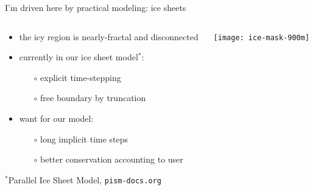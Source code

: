\documentclass{beamer}
\begin{document}
\begin{frame}{I'm driven here by practical modeling: ice sheets}

\begin{columns}
\begin{column}{0.5\textwidth}
\begin{itemize}
\small
\item the icy region is nearly-fractal and disconnected
\item currently in our ice sheet model$^*$:
  \begin{itemize}
  \item[$\circ$] explicit time-stepping
  \item[$\circ$] free boundary by truncation
  \end{itemize}
\item want for our model:
  \begin{itemize}
  \item[$\circ$] long implicit time steps
  \item[$\circ$] better conservation accounting to user
  \end{itemize}
\end{itemize}

\vspace{10mm}
{\scriptsize $^*$Parallel Ice Sheet Model, \texttt{pism-docs.org}}
\end{column}
\begin{column}{0.5\textwidth}
\vspace{-5mm}

\begin{center}
\texttt{[image: ice-mask-900m]}
\end{center}
\end{column}
\end{columns}
\end{frame}
\end{document}
